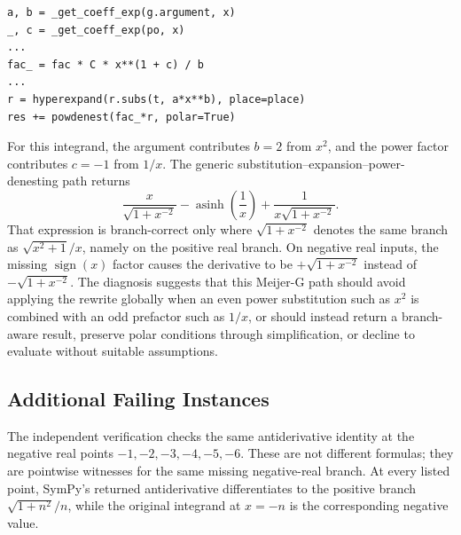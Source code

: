 \documentclass[11pt]{article}
\begin{document}
\begin{lstlisting}[style=bugpython]
a, b = _get_coeff_exp(g.argument, x)
_, c = _get_coeff_exp(po, x)
...
fac_ = fac * C * x**(1 + c) / b
...
r = hyperexpand(r.subs(t, a*x**b), place=place)
res += powdenest(fac_*r, polar=True)
\end{lstlisting}

For this integrand, the argument contributes \(b=2\) from \(x^2\), and the
power factor contributes \(c=-1\) from \(1/x\). The generic
substitution--expansion--power-denesting path returns
\[
    \frac{x}{\sqrt{1+x^{-2}}}
    - \operatorname{asinh}\!\left(\frac{1}{x}\right)
    + \frac{1}{x\sqrt{1+x^{-2}}}.
\]
That expression is branch-correct only where
\(\sqrt{1+x^{-2}}\) denotes the same branch as
\(\sqrt{x^2+1}/x\), namely on the positive real branch. On negative real
inputs, the missing \(\operatorname{sign}(x)\) factor causes the derivative to
be \(+\sqrt{1+x^{-2}}\) instead of \(-\sqrt{1+x^{-2}}\). The diagnosis suggests
that this Meijer-G path should avoid applying the rewrite globally when an even
power substitution such as \(x^2\) is combined with an odd prefactor such as
\(1/x\), or should instead return a branch-aware result, preserve polar
conditions through simplification, or decline to evaluate without suitable
assumptions.

\subsection{Additional Failing Instances}

The independent verification checks the same antiderivative identity at the
negative real points \(-1,-2,-3,-4,-5,-6\). These are not different formulas;
they are pointwise witnesses for the same missing negative-real branch. At
every listed point, SymPy's returned antiderivative differentiates to the
positive branch \(\sqrt{1+n^2}/n\), while the original integrand at \(x=-n\)
is the corresponding negative value.
\end{document}
